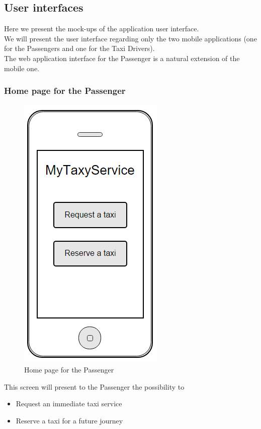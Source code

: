 \subsection{User interfaces}
Here we present the mock-ups of the application user interface.\\
We will present the user interface regarding only the two mobile applications (one for the Passengers and one for the Taxi Drivers).\\
The web application interface for the Passenger is a natural extension of the mobile one.
\subsubsection{Home page for the Passenger}
\begin{figure}[H]
\centering
\includegraphics[scale=0.6]{Images/home_page}
\caption{Home page for the Passenger}
\end{figure}
This screen will present to the Passenger the possibility to 
\begin{itemize}
\item Request an immediate taxi service
\item Reserve a taxi for a future journey
\end{itemize}

